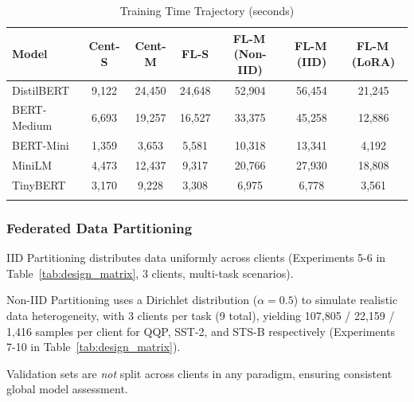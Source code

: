 \begin{table}[t]
  \centering
  \caption{Training Time Trajectory (seconds)}
  \label{tab:time_trajectory}
  \footnotesize
  \setlength{\tabcolsep}{4pt}
  \begin{tabular}{lcccccc}
    \toprule
    Model & Cent-S & Cent-M & FL-S & FL-M\,(Non-IID) & FL-M\,(IID) & FL-M\,(LoRA) \\
    \midrule
    DistilBERT  & 9{,}122  & 24{,}450 & 24{,}648 & 52{,}904 & 56{,}454 & 21{,}245 \\
    BERT-Medium & 6{,}693  & 19{,}257 & 16{,}527 & 33{,}375 & 45{,}258 & 12{,}886 \\
    BERT-Mini   & 1{,}359  &  3{,}653 &  5{,}581 & 10{,}318 & 13{,}341 &  4{,}192 \\
    MiniLM      & 4{,}473  & 12{,}437 &  9{,}317 & 20{,}766 & 27{,}930 & 18{,}808 \\
    TinyBERT    & 3{,}170  &  9{,}228 &  3{,}308 &  6{,}975 &  6{,}778 &  3{,}561 \\
    \bottomrule
    \addlinespace[2pt]
  \end{tabular}
\end{table}


\subsubsection{Federated Data Partitioning}



IID Partitioning distributes data uniformly across clients (Experiments 5-6 in Table~\ref{tab:design_matrix}, 3 clients, multi-task scenarios).

Non-IID Partitioning uses a Dirichlet distribution ($\alpha{=}0.5$) to simulate realistic data heterogeneity, with 3 clients per task (9 total), yielding 107,805 / 22,159 / 1,416 samples per client for QQP, SST-2, and STS-B respectively (Experiments 7-10 in Table~\ref{tab:design_matrix}).

Validation sets are \emph{not} split across clients in any paradigm, ensuring consistent global model assessment.

